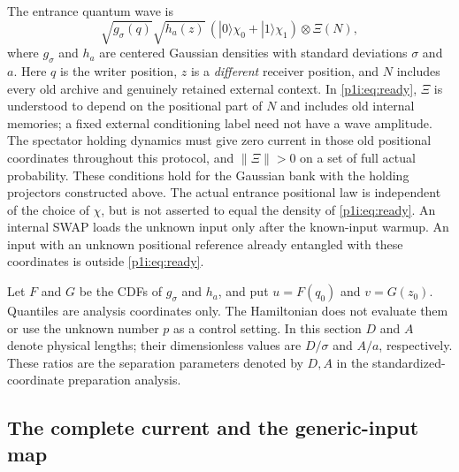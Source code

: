 \documentclass[11pt]{article}
\numberwithin{equation}{section}
\theoremstyle{definition}
\theoremstyle{remark}
\begin{document}
The entrance quantum wave is
\begin{equation}\label{p1i:eq:ready}
 \sqrt{g_\sigma(q)}\sqrt{h_a(z)}\,
 (|0\rangle\chi_0+|1\rangle\chi_1)\otimes\Xi(N),
\end{equation}
where $g_\sigma$ and $h_a$ are centered Gaussian densities with standard
deviations $\sigma$ and $a$. Here $q$ is the writer position, $z$ is a
\emph{different} receiver position, and $N$ includes every old archive and
genuinely retained external context. In \eqref{p1i:eq:ready}, $\Xi$ is
understood to depend on the positional part of $N$ and includes old
internal memories; a fixed external conditioning label need not have a
wave amplitude. The spectator holding dynamics must give zero current
in those old positional coordinates throughout this protocol, and
$\|\Xi\|>0$ on a set of full actual probability. These conditions hold
for the Gaussian bank with the holding projectors constructed above.
The actual entrance positional law is independent of
the choice of $\chi$, but is not asserted to equal the density of
\eqref{p1i:eq:ready}. An internal SWAP loads the unknown input only after the
known-input warmup. An input with an unknown positional reference already
entangled with these coordinates is outside \eqref{p1i:eq:ready}.

Let $F$ and $G$ be the CDFs of $g_\sigma$ and $h_a$, and put
$u=F(q_0)$ and $v=G(z_0)$. Quantiles are analysis coordinates only. The
Hamiltonian does not evaluate them or use the unknown number $p$ as a
control setting.
In this section $D$ and $A$ denote physical lengths; their dimensionless
values are $D/\sigma$ and $A/a$, respectively. These ratios are the
separation parameters denoted by $D,A$ in the standardized-coordinate
preparation analysis.

\subsection{The complete current and the generic-input map}
\end{document}
